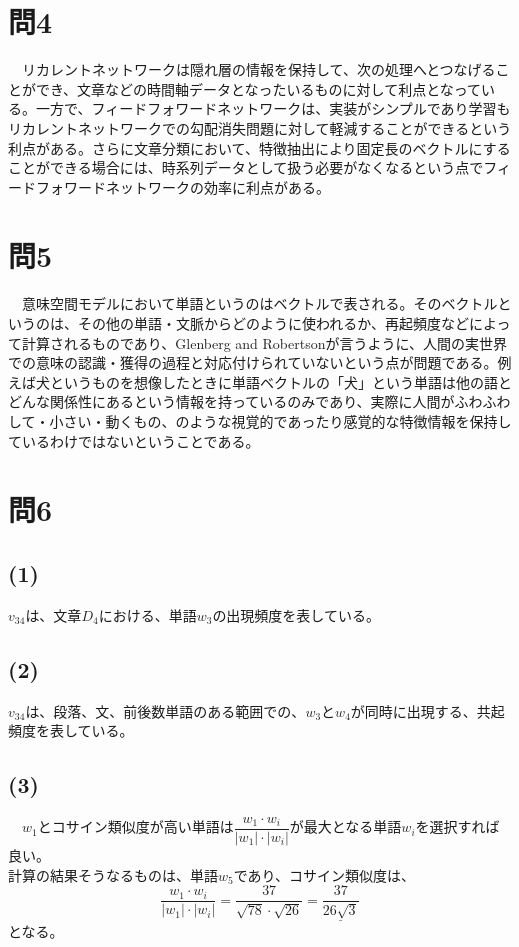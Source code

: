 \documentclass[a4j]{jarticle} %
\begin{document}
\section*{問4}
　リカレントネットワークは隠れ層の情報を保持して、次の処理へとつなげることができ、文章などの時間軸データとなったいるものに対して利点となっている。一方で、フィードフォワードネットワークは、実装がシンプルであり学習もリカレントネットワークでの勾配消失問題に対して軽減することができるという利点がある。さらに文章分類において、特徴抽出により固定長のベクトルにすることができる場合には、時系列データとして扱う必要がなくなるという点でフィードフォワードネットワークの効率に利点がある。

\section*{問5}
　意味空間モデルにおいて単語というのはベクトルで表される。そのベクトルというのは、その他の単語・文脈からどのように使われるか、再起頻度などによって計算されるものであり、Glenberg and Robertsonが言うように、人間の実世界での意味の認識・獲得の過程と対応付けられていないという点が問題である。例えば犬というものを想像したときに単語ベクトルの「犬」という単語は他の語とどんな関係性にあるという情報を持っているのみであり、実際に人間がふわふわして・小さい・動くもの、のような視覚的であったり感覚的な特徴情報を保持しているわけではないということである。

\section*{問6}
\subsection*{(1)}
$v_{34}$は、文章$D_4$における、単語$w_3$の出現頻度を表している。
\subsection*{(2)}
$v_{34}$は、段落、文、前後数単語のある範囲での、$w_3$と$w_4$が同時に出現する、共起頻度を表している。
\subsection*{(3)}
　$w_1$とコサイン類似度が高い単語は$\dfrac{w_1\cdot w_i}{|w_1|\cdot|w_i|}$が最大となる単語$w_i$を選択すれば良い。\\
計算の結果そうなるものは、単語$w_5$であり、コサイン類似度は、
\begin{equation}
  \dfrac{w_1\cdot w_i}{|w_1|\cdot|w_i|} = \dfrac{37}{\sqrt{78} \cdot \sqrt{26}} = \underline{\dfrac{37}{26\sqrt{3}}}
\end{equation}
となる。
\end{document}
